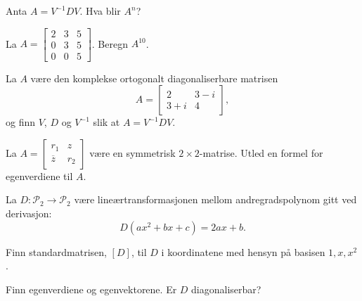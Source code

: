 \begin{oppgave}
Anta $A=V^{-1}DV$. 
Hva blir $A^n$? 
\end{oppgave}

\begin{oppgave}
La
$A=\begin{bmatrix}
2 & 3 & 5\\
0 & 3 & 5\\
0 & 0 & 5
\end{bmatrix}$. Beregn $A^{10}$.
\end{oppgave}

\begin{oppgave}
La $A$ være den komplekse ortogonalt diagonaliserbare matrisen 
\[
A=\begin{bmatrix}
2 & 3-i\\
3+i & 4
\end{bmatrix},
\]
og finn $V$, $D$ og $V^{-1}$ slik at $A=V^{-1}DV$.
\end{oppgave}

\begin{oppgave}
La $A=\begin{bmatrix}
r_1 & z\\
\overline{z} & r_2
\end{bmatrix}$ være en symmetrisk $2 \times 2$-matrise. Utled en formel for egenverdiene til $A$.
\end{oppgave}

\begin{oppgave}
La $D:\mathcal{P}_2\rightarrow \mathcal{P}_2$ være lineærtransformasjonen mellom andregradspolynom gitt ved derivasjon: $$D(ax^2+bx+c)=2ax+b.$$

\begin{punkt}
Finn standardmatrisen, $[D]$, til $D$ i koordinatene med hensyn på basisen $1,x,x^2$.
\end{punkt}

\begin{punkt}
Finn egenverdiene og egenvektorene. Er $D$ diagonaliserbar?
\end{punkt}

\end{oppgave}

